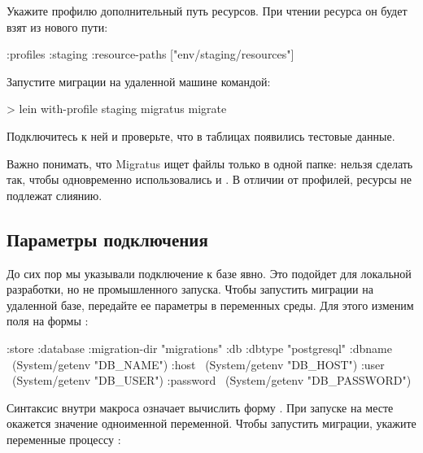Укажите профилю  дополнительный путь ресурсов. При чтении ресурса  он будет взят из нового пути:

\begin{english}
  \begin{clojure}
{:profiles
 {:staging
  {:resource-paths ["env/staging/resources"]}}}
  \end{clojure}
\end{english}

Запустите миграции на удаленной машине командой:

\begin{english}
  \begin{bash}
> lein with-profile staging migratus migrate
  \end{bash}
\end{english}

Подключитесь к ней и проверьте, что в таблицах появились тестовые данные.

Важно понимать, что Migratus ищет файлы только в одной папке: нельзя сделать так, чтобы одновременно использовались  и . В отличии от профилей, ресурсы не подлежат слиянию.

\subsection{Параметры подключения}

До сих пор мы указывали подключение к базе явно. Это подойдет для локальной разработки, но не промышленного запуска. Чтобы запустить миграции на удаленной базе, передайте ее параметры в переменных среды. Для этого изменим поля  на формы :

\begin{english}
  \begin{clojure/lines}
{:store :database
 :migration-dir "migrations"
 :db {:dbtype "postgresql"
      :dbname ~(System/getenv "DB_NAME")
      :host ~(System/getenv "DB_HOST")
      :user ~(System/getenv "DB_USER")
      :password ~(System/getenv "DB_PASSWORD")}}
  \end{clojure/lines}
\end{english}

Синтаксис  внутри макроса  означает вычислить форму . При запуске  на месте  окажется значение одноименной переменной. Чтобы запустить миграции, укажите переменные процессу :

